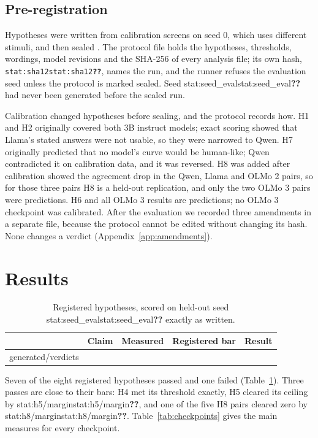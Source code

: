 \documentclass[11pt]{article}
\makeatletter
\newcommand{\stat}[1]{\ifcsname stat:#1\endcsname\csname stat:#1\endcsname\else\textbf{??}\fi}
\newcommand*{\rows}[1]{\@@input #1 }
\makeatother
\begin{document}
\subsection{Pre-registration}
\label{sec:prereg}
Hypotheses were written from calibration screens on seed 0, which uses different stimuli, and then sealed \citep{nosek2018preregistration}. The protocol file holds the hypotheses, thresholds, wordings, model revisions and the SHA-256 of every analysis file; its own hash, \texttt{\stat{sha12}}, names the run, and the runner refuses the evaluation seed unless the protocol is marked sealed. Seed \stat{seed_eval} had never been generated before the sealed run.

Calibration changed hypotheses before sealing, and the protocol records how. H1 and H2 originally covered both 3B instruct models; exact scoring showed that Llama's stated answers were not usable, so they were narrowed to Qwen. H7 originally predicted that no model's curve would be human-like; Qwen contradicted it on calibration data, and it was reversed. H8 was added after calibration showed the agreement drop in the Qwen, Llama and OLMo 2 pairs, so for those three pairs H8 is a held-out replication, and only the two OLMo 3 pairs were predictions. H6 and all OLMo 3 results are predictions; no OLMo 3 checkpoint was calibrated. After the evaluation we recorded three amendments in a separate file, because the protocol cannot be edited without changing its hash. None changes a verdict (Appendix~\ref{app:amendments}).

\section{Results}

\begin{table}[t]
\centering
\small
\caption{Registered hypotheses, scored on held-out seed \stat{seed_eval} exactly as written.}
\label{tab:verdicts}
\begin{tabularx}{\textwidth}{@{}l>{\raggedright\arraybackslash}X>{\raggedright\arraybackslash}X>{\raggedright\arraybackslash}Xl@{}}
\toprule
 & Claim & Measured & Registered bar & Result \\
\midrule
\rows{generated/verdicts}
\bottomrule
\end{tabularx}
\end{table}

Seven of the eight registered hypotheses passed and one failed (Table~\ref{tab:verdicts}). Three passes are close to their bars: H4 met its threshold exactly, H5 cleared its ceiling by \stat{h5/margin}, and one of the five H8 pairs cleared zero by \stat{h8/margin}. Table~\ref{tab:checkpoints} gives the main measures for every checkpoint.
\end{document}
